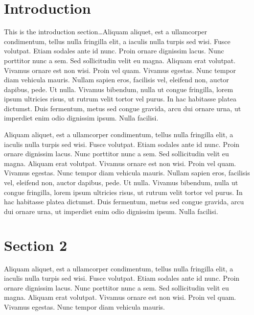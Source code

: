 \documentclass[11pt]{article}
\begin{document}
\newpage

\setcounter{page}{1} 


\section{Introduction}
\label{sec:intro}
\vspace{-0.2in}
%
This is the introduction section\ldots Aliquam aliquet, est a ullamcorper condimentum, tellus nulla fringilla elit, a iaculis nulla turpis sed wisi. Fusce volutpat. Etiam sodales ante id nunc. Proin ornare dignissim lacus. Nunc porttitor nunc a sem. Sed sollicitudin velit eu magna. Aliquam erat volutpat. Vivamus ornare est non wisi. Proin vel quam. Vivamus egestas. Nunc tempor diam vehicula mauris. Nullam sapien eros, facilisis vel, eleifend non, auctor dapibus, pede. Ut nulla. Vivamus bibendum, nulla ut congue fringilla, lorem ipsum ultricies risus, ut rutrum velit tortor vel purus. In hac habitasse platea dictumst. Duis fermentum, metus sed congue gravida, arcu dui ornare urna, ut imperdiet enim odio dignissim ipsum. Nulla facilisi. 

Aliquam aliquet, est a ullamcorper condimentum, tellus nulla fringilla elit, a iaculis nulla turpis sed wisi. Fusce volutpat. Etiam sodales ante id nunc. Proin ornare dignissim lacus. Nunc porttitor nunc a sem. Sed sollicitudin velit eu magna. Aliquam erat volutpat. Vivamus ornare est non wisi. Proin vel quam. Vivamus egestas. Nunc tempor diam vehicula mauris. Nullam sapien eros, facilisis vel, eleifend non, auctor dapibus, pede. Ut nulla. Vivamus bibendum, nulla ut congue fringilla, lorem ipsum ultricies risus, ut rutrum velit tortor vel purus. In hac habitasse platea dictumst. Duis fermentum, metus sed congue gravida, arcu dui ornare urna, ut imperdiet enim odio dignissim ipsum. Nulla facilisi. 


\section{Section 2}
\label{sec:section_2_label}
\vspace{-0.2in}
%
Aliquam aliquet, est a ullamcorper condimentum, tellus nulla fringilla elit, a iaculis nulla turpis sed wisi. Fusce volutpat. Etiam sodales ante id nunc. Proin ornare dignissim lacus. Nunc porttitor nunc a sem. Sed sollicitudin velit eu magna. Aliquam erat volutpat. Vivamus ornare est non wisi. Proin vel quam. Vivamus egestas. Nunc tempor diam vehicula mauris. 
\end{document}
